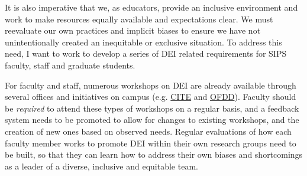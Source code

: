 \documentclass[11pt]{article}
\begin{document}

















It is also imperative that we, as educators, provide an inclusive environment and work to make resources equally available and expectations clear. We must reevaluate our own practices and implicit biases to ensure we have not unintentionally created an inequitable or exclusive situation. To address this need, I want to work to develop a series of DEI related requirements for SIPS faculty, staff and graduate students. 

For faculty and staff, numerous workshops on DEI are already available through several offices and initiatives on campus (e.g. \href{https://hr.cornell.edu/professional-development/training/cite}{CITE} and \href{https://facultydevelopment.cornell.edu/}{OFDD}). Faculty should be \emph{required} to attend these types of workshops on a regular basis, and a feedback system needs to be promoted to allow for changes to existing workshops, and the creation of new ones based on observed needs. Regular evaluations of how each faculty member works to promote DEI within their own research groups need to be built, so that they can learn how to address their own biases and shortcomings as a leader of a diverse, inclusive and equitable team.
\end{document}
